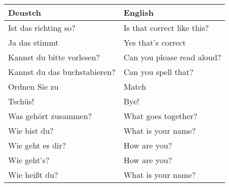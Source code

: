 \documentclass{article}
\renewcommand{\arraystretch}{1}
\begin{document}
\begin{minipage}{0.48\textwidth}
    \centering
    \renewcommand{\arraystretch}{1.5}
    \begin{tabular}{|>{\raggedright\arraybackslash}p{3.5cm}|>{\raggedright\arraybackslash}p{3.5cm}|}
        \hline
        \rowcolor{gray!20} \textbf{Deustch} & \textbf{English} \\
        \hline
        Ist das richting so? & Is that correct like this? \\\hline
        Ja das stimmt & Yes that's correct \\\hline
        Kannst du bitte vorlesen? &  Can you please read aloud? \\\hline
        Kannst du das buchstabieren? & Can you spell that? \\\hline
        Ordnen Sie zu & Match \\\hline
        Tschüs! & Bye! \\\hline
        Was gehört zusammen? & What goes together? \\\hline
        Wie bist du? & What is your name? \\\hline
        Wie geht es dir? &  How are you? \\\hline
        Wie geht's? &  How are you? \\\hline
        Wie hei\ss{}t du? & What is your name? \\\hline
    \end{tabular}
\end{minipage}
\end{document}

